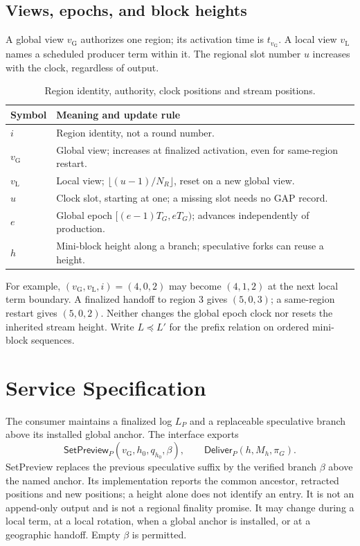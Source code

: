 \documentclass[11pt,a4paper,onecolumn]{article}
\newcommand{\gv}{v_{\mathrm G}}
\newcommand{\lv}{v_{\mathrm L}}
\newcommand{\pre}{\preceq}
\newcommand{\Tag}[1]{\mathsf{#1}}
\theoremstyle{remark}\newtheorem{example}[definition]{Example}
\begin{document}
\subsection{Views, epochs, and block heights}\label{sec:indices}
A global view $\gv$ authorizes one region; its activation time is
$t_{\gv}$. A local view $\lv$ names a scheduled producer term within it.
The regional slot number $u$ increases with the clock, regardless of output.
\begin{table}[H]\centering\small
\begin{tabularx}{\textwidth}{@{}p{}Y@{}}\toprule
Symbol & Meaning and update rule\\\midrule
$i$ & Region identity, not a round number.\\
$\gv$ & Global view; increases at finalized activation, even for same-region restart.\\
$\lv$ & Local view; $\lfloor(u-1)/N_R\rfloor$, reset on a new global view.\\
$u$ & Clock slot, starting at one; a missing slot needs no GAP record.\\
$e$ & Global epoch $[(e-1)T_G,eT_G)$; advances independently of production.\\
$h$ & Mini-block height along a branch; speculative forks can reuse a height.\\
\bottomrule\end{tabularx}
\caption{Region identity, authority, clock positions and stream positions.}
\end{table}
For example, $(\gv,\lv,i)=(4,0,2)$ may become $(4,1,2)$ at the next local
term boundary. A finalized handoff to region 3 gives $(5,0,3)$; a same-region
restart gives $(5,0,2)$. Neither changes the global epoch clock nor resets the
inherited stream height. Write $L\pre L'$ for the prefix relation on ordered
mini-block sequences.

\section{Service Specification}\label{sec:spec}
The consumer maintains a finalized log $L_P$ and a replaceable speculative
branch above its installed global anchor. The interface exports
\[
 \Tag{SetPreview}_P(\gv,h_0,q_{h_0},\beta),\qquad
 \Tag{Deliver}_P(h,M_h,\pi_G).
\]
SetPreview replaces the previous speculative suffix by the verified branch
$\beta$ above the named anchor. Its implementation reports the common ancestor,
retracted positions and new positions; a height alone does not identify an
entry. It is not an append-only output and is not a regional finality promise.
It may change during a local term, at a local rotation, when a global anchor
is installed, or at a geographic handoff. Empty $\beta$ is permitted.
\end{document}

